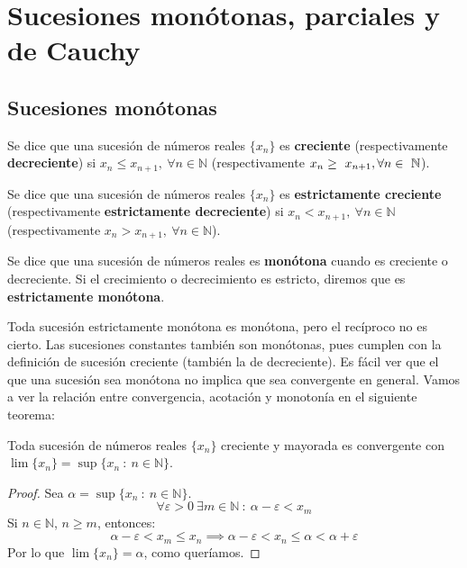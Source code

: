 \chapter{Sucesiones monótonas, parciales y de Cauchy}\label{chp:Tema6}


\section{Sucesiones monótonas}
\begin{definicion}
    Se dice que una sucesión de números reales $\{x_n\}$ es \textbf{creciente} (respectivamente \textbf{decreciente}) si $x_n \leq x_{n+1}, ~\forall n \in \mathbb{N}$ (respectivamente $x_n \geq~x_{n+1},\\\forall n \in~\mathbb{N}$).
\end{definicion}

\begin{definicion}
    Se dice que una sucesión de números reales $\{x_n\}$ es \textbf{estrictamente creciente} (respectivamente \textbf{estrictamente decreciente}) si $x_n < x_{n+1}, ~\forall n \in \mathbb{N}$ (respectivamente $x_n > x_{n+1}, ~\forall n \in \mathbb{N}$).
\end{definicion}

\begin{definicion}
    Se dice que una sucesión de números reales es \textbf{monótona} cuando es creciente o decreciente. Si el crecimiento o decrecimiento es estricto, diremos que es \textbf{estrictamente monótona}.
\end{definicion}

Toda sucesión estrictamente monótona es monótona, pero el recíproco no es cierto. Las sucesiones constantes también son monótonas, pues cumplen con la definición de sucesión creciente (también la de decreciente). Es fácil ver que el que una sucesión sea monótona no implica que sea convergente en general. Vamos a ver la relación entre convergencia, acotación y monotonía
en el siguiente teorema:
\begin{teo}
    Toda sucesión de números reales $\{x_n\}$ creciente y mayorada es convergente con $\lim \{x_n\}=\sup \{x_n ~:~ n \in \mathbb{N}\}$.
\end{teo}
\begin{proof}
    Sea $\alpha = \sup \{x_n ~:~ n \in \mathbb{N}\}$.
    \begin{equation*}
        \forall \varepsilon > 0 ~\exists m \in \mathbb{N} ~:~ \alpha - \varepsilon < x_m
    \end{equation*}
    Si $n \in \mathbb{N}$, $n \geq m$, entonces:
    \begin{equation*}
        \alpha - \varepsilon < x_m \leq x_n \implies \alpha - \varepsilon < x_n \leq \alpha < \alpha + \varepsilon
    \end{equation*}
    Por lo que $\lim \{x_n\} = \alpha$, como queríamos. 
\end{proof}

